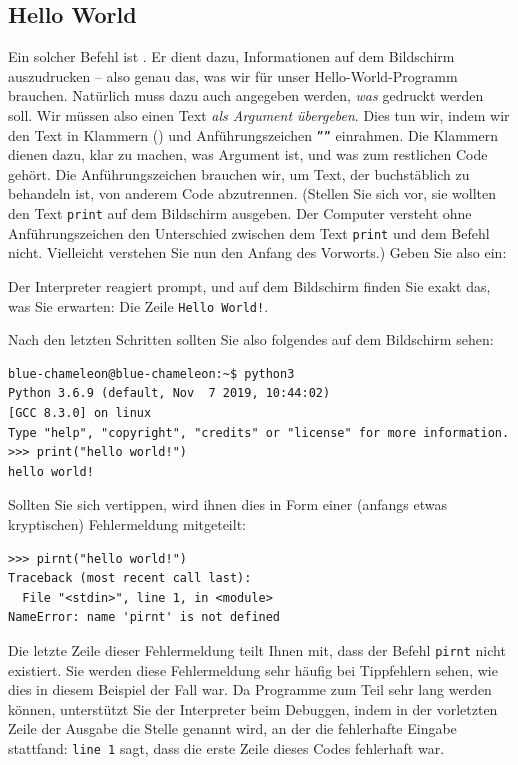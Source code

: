 \subsection{Hello World}
Ein solcher Befehl ist . Er dient dazu, Informationen auf dem Bildschirm auszudrucken -- also genau das, was wir für unser Hello-World-Programm brauchen. Natürlich muss dazu auch angegeben werden, \emph{was} gedruckt werden soll. Wir müssen also einen Text \emph{als Argument übergeben}. Dies tun wir, indem wir den Text in Klammern () und Anführungszeichen \texttt{''''} einrahmen. Die Klammern dienen dazu, klar zu machen, was Argument ist, und was zum restlichen Code gehört. Die Anführungszeichen brauchen wir, um Text, der buchstäblich zu behandeln ist, von anderem Code abzutrennen. (Stellen Sie sich vor, sie wollten den Text \texttt{print} auf dem Bildschirm ausgeben. Der Computer versteht ohne Anführungszeichen den Unterschied zwischen dem Text \texttt{print} und dem Befehl  nicht. Vielleicht verstehen Sie nun den Anfang des Vorworts.) Geben Sie also ein:

\begin{center}
\end{center}

Der Interpreter reagiert prompt, und auf dem Bildschirm finden Sie exakt das, was Sie erwarten: Die Zeile \texttt{Hello World!}.

Nach den letzten Schritten sollten Sie also folgendes auf dem Bildschirm sehen:
\begin{cmdbox}
\begin{verbatim}
blue-chameleon@blue-chameleon:~$ python3
Python 3.6.9 (default, Nov  7 2019, 10:44:02)
[GCC 8.3.0] on linux
Type "help", "copyright", "credits" or "license" for more information.
>>> print("hello world!")
hello world!
\end{verbatim}
\end{cmdbox}

Sollten Sie sich vertippen, wird ihnen dies in Form einer (anfangs etwas kryptischen) Fehlermeldung mitgeteilt:
\begin{cmdbox}
\begin{verbatim}
>>> pirnt("hello world!")
Traceback (most recent call last):
  File "<stdin>", line 1, in <module>
NameError: name 'pirnt' is not defined
\end{verbatim}
\end{cmdbox}
Die letzte Zeile dieser Fehlermeldung teilt Ihnen mit, dass der Befehl \texttt{pirnt} nicht existiert. Sie werden diese Fehlermeldung sehr häufig bei Tippfehlern sehen, wie dies in diesem Beispiel der Fall war. Da Programme zum Teil sehr lang werden können, unterstützt Sie der Interpreter beim Debuggen, indem in der vorletzten Zeile der Ausgabe die Stelle genannt wird, an der die fehlerhafte Eingabe stattfand: \texttt{line 1} sagt, dass die erste Zeile dieses Codes fehlerhaft war.

